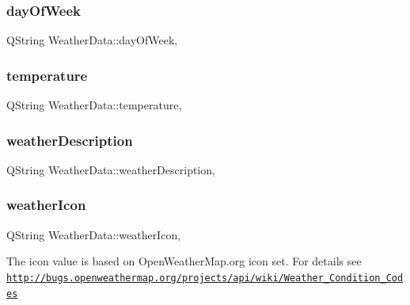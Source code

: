 \subsubsection{\texorpdfstring{day\+Of\+Week}{dayOfWeek}}
{\footnotesize\ttfamily Q\+String Weather\+Data\+::day\+Of\+Week\hspace{0.3cm}{\ttfamily [read]}, {\ttfamily [write]}}

\mbox{\label{class_weather_data_a2ee510e51cb81a6a479cd0af5f291e2c}} 
\subsubsection{\texorpdfstring{temperature}{temperature}}
{\footnotesize\ttfamily Q\+String Weather\+Data\+::temperature\hspace{0.3cm}{\ttfamily [read]}, {\ttfamily [write]}}

\mbox{\label{class_weather_data_a8b470bc177e317a6a6a6b51758724a1a}} 
\subsubsection{\texorpdfstring{weather\+Description}{weatherDescription}}
{\footnotesize\ttfamily Q\+String Weather\+Data\+::weather\+Description\hspace{0.3cm}{\ttfamily [read]}, {\ttfamily [write]}}

\mbox{\label{class_weather_data_aca04e1877e2d5bc6da0f1e9910553741}} 
\subsubsection{\texorpdfstring{weather\+Icon}{weatherIcon}}
{\footnotesize\ttfamily Q\+String Weather\+Data\+::weather\+Icon\hspace{0.3cm}{\ttfamily [read]}, {\ttfamily [write]}}

The icon value is based on Open\+Weather\+Map.\+org icon set. For details see \href{http://bugs.openweathermap.org/projects/api/wiki/Weather_Condition_Codes}{\tt http\+://bugs.\+openweathermap.\+org/projects/api/wiki/\+Weather\+\_\+\+Condition\+\_\+\+Codes}


